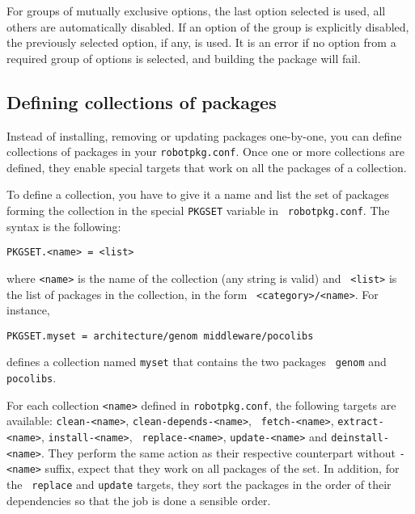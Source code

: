 For groups of mutually exclusive options, the last option selected is used, all
others are automatically  disabled.  If  an option of  the  group is explicitly
disabled, the previously selected option,  if any, is used.   It is an error if
no option from  a  required group  of  options is  selected, and  building  the
package will fail.


\subsection{Defining collections of packages} %

Instead of installing, removing or updating packages one-by-one, you can define
collections  of  packages  in  your  {\tt  robotpkg.conf}.  Once  one  or  more
collections  are defined,  they enable  special targets  that work  on  all the
packages of a collection.

To define a collection, you have to give it a name and list the set of packages
forming  the  collection   in  the  special  {\tt  PKGSET}   variable  in  {\tt
robotpkg.conf}. The syntax is the following:

\begin{verbatim}
PKGSET.<name> = <list>
\end{verbatim}

where {\tt <name>} is the name of the collection (any string is valid) and {\tt
<list>}  is  the  list  of  packages  in  the  collection,  in  the  form  {\tt
<category>/<name>}. For instance,

\begin{verbatim}
PKGSET.myset = architecture/genom middleware/pocolibs
\end{verbatim}

defines  a collection named  {\tt myset}  that contains  the two  packages {\tt
genom} and {\tt pocolibs}.

For each collection {\tt <name>}  defined in {\tt robotpkg.conf}, the following
targets  are available:  {\tt clean-<name>},  {\tt  clean-depends-<name>}, {\tt
fetch-<name>},    {\tt     extract-<name>},    {\tt    install-<name>},    {\tt
replace-<name>}, {\tt  update-<name>} and {\tt  deinstall-<name>}. They perform
the same action  as their respective counterpart without  {\tt -<name>} suffix,
expect that  they work on all  packages of the  set. In addition, for  the {\tt
replace} and {\tt update} targets, they sort the packages in the order of their
dependencies so that the job is done a sensible order.

